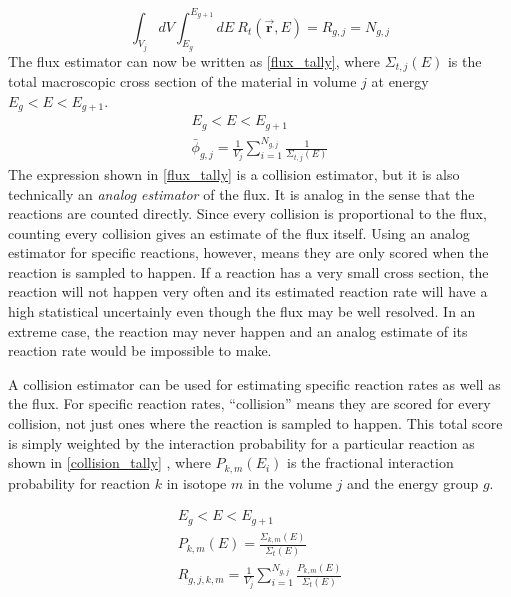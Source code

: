 %
\begin{equation}
\label{RR_coll}
\int_{V_j} dV \int_{E_g}^{E_{g+1}} dE \: R_t(\boldsymbol{\vec{r}},E) = R_{g,j} = N_{g,j}
\end{equation}
%
The flux estimator can now be written as \eqref{flux_tally}, where $\Sigma_{t,j}(E)$ is the total macroscopic cross section  of the material in volume $j$ at energy $E_g < E < E_{g+1}$.
%
\begin{equation}
\label{flux_tally}
\begin{gathered}
E_g < E < E_{g+1} \\
\bar{\phi}_{g,j} =  \frac{1}{V_j} \sum_{i=1}^{N_{g,j}} \frac{1}{\Sigma_{t,j}(E)} 
\end{gathered}
\end{equation}
%
The expression shown in \eqref{flux_tally} is a collision estimator, but it is also technically an \emph{analog estimator} of the flux.  It is analog in the sense that the reactions are counted directly.  Since every collision is proportional to the flux, counting every collision gives an estimate of the flux itself.  Using an analog estimator for specific reactions, however, means they are only scored when the reaction is sampled to happen.  If a reaction has a very small cross section, the reaction will not happen very often and its estimated reaction rate will have a high statistical uncertainly even though the flux may be well resolved.  In an extreme case, the reaction may never happen and an analog estimate of its reaction rate would be impossible to make.  

A collision estimator can be used for estimating specific reaction rates as well as the flux.  For specific reaction rates, ``collision'' means they are scored for every collision, not just ones where the reaction is sampled to happen.  This total score is simply weighted by the interaction probability for a particular reaction as shown in \eqref{collision_tally} \cite{jaakko}, where $P_{k,m}(E_i)$ is the fractional interaction probability for reaction $k$ in isotope $m$ in the volume $j$ and the energy group $g$.

\begin{equation}
\label{collision_tally}
\begin{gathered}
E_g < E < E_{g+1} \\
P_{k,m}(E)= \frac{\Sigma_{k,m}(E)}{\Sigma_t(E)} \\
R_{g,j,k,m} =  \frac{1}{V_j} \sum_{i=1}^{N_{g,j}} \frac{P_{k,m}(E)}{\Sigma_t(E)}
\end{gathered}
\end{equation}




